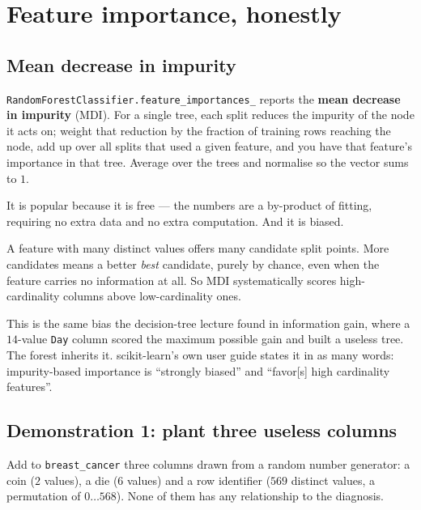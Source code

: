 \documentclass[11pt]{article}
\begin{document}
\section{Feature importance, honestly}
\label{sec:imp}

\subsection{Mean decrease in impurity}

\texttt{RandomForestClassifier.feature\_importances\_} reports the
\textbf{mean decrease in impurity} (MDI). For a single tree, each split
reduces the impurity of the node it acts on; weight that reduction by the
fraction of training rows reaching the node, add up over all splits that used
a given feature, and you have that feature's importance in that tree. Average
over the trees and normalise so the vector sums to $1$.

It is popular because it is free --- the numbers are a by-product of fitting,
requiring no extra data and no extra computation. And it is biased.

\begin{caution}
A feature with many distinct values offers many candidate split points. More
candidates means a better \emph{best} candidate, purely by chance, even when
the feature carries no information at all. So MDI systematically scores
high-cardinality columns above low-cardinality ones.

This is the same bias the decision-tree lecture found in information gain,
where a $14$-value \texttt{Day} column scored the maximum possible gain and
built a useless tree. The forest inherits it. scikit-learn's own user guide
states it in as many words: impurity-based importance is ``strongly biased''
and ``favor[s] high cardinality features''.
\end{caution}

\subsection{Demonstration 1: plant three useless columns}

Add to \texttt{breast\_cancer} three columns drawn from a random number
generator: a coin ($2$ values), a die ($6$ values) and a row identifier ($569$
distinct values, a permutation of $0 \dots 568$). None of them has any
relationship to the diagnosis.
\end{document}
